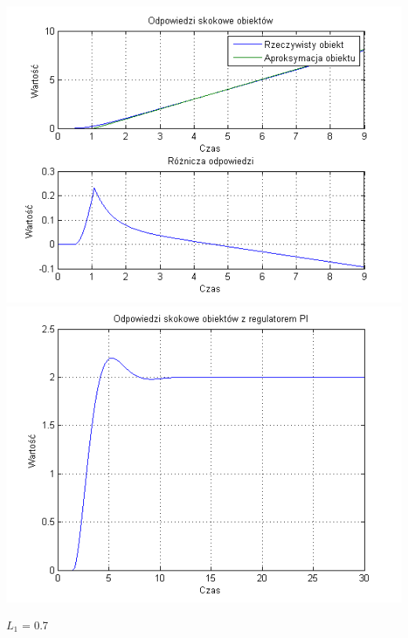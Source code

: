 \documentclass[10pt,a4paper]{article}
\begin{document}
\begin{center}
\includegraphics[scale=1]{images/jeden/skrypt_145.png}\\
\includegraphics[scale=1]{images/jeden/skrypt_146.png}\\
\end{center}
\newpage
$L_1$ = 0.7
\end{document}
